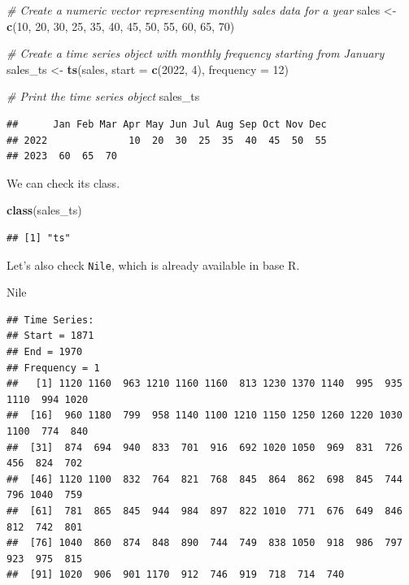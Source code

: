 \documentclass[
]{book}
\newenvironment{Shaded}{\begin{snugshade}}{\end{snugshade}}
\newcommand{\AttributeTok}[1]{\textcolor[rgb]{0.13,0.29,0.53}{#1}}
\newcommand{\CommentTok}[1]{\textcolor[rgb]{0.56,0.35,0.01}{\textit{#1}}}
\newcommand{\DecValTok}[1]{\textcolor[rgb]{0.00,0.00,0.81}{#1}}
\newcommand{\FunctionTok}[1]{\textcolor[rgb]{0.13,0.29,0.53}{\textbf{#1}}}
\newcommand{\NormalTok}[1]{#1}
\newcommand{\OtherTok}[1]{\textcolor[rgb]{0.56,0.35,0.01}{#1}}
\begin{document}
\begin{Shaded}
\begin{Highlighting}[]
\CommentTok{\# Create a numeric vector representing monthly sales data for a year}
\NormalTok{sales }\OtherTok{\textless{}{-}} \FunctionTok{c}\NormalTok{(}\DecValTok{10}\NormalTok{, }\DecValTok{20}\NormalTok{, }\DecValTok{30}\NormalTok{, }\DecValTok{25}\NormalTok{, }\DecValTok{35}\NormalTok{, }\DecValTok{40}\NormalTok{, }\DecValTok{45}\NormalTok{, }\DecValTok{50}\NormalTok{, }\DecValTok{55}\NormalTok{, }\DecValTok{60}\NormalTok{, }\DecValTok{65}\NormalTok{, }\DecValTok{70}\NormalTok{)}

\CommentTok{\# Create a time series object with monthly frequency starting from January}
\NormalTok{sales\_ts }\OtherTok{\textless{}{-}} \FunctionTok{ts}\NormalTok{(sales, }\AttributeTok{start =} \FunctionTok{c}\NormalTok{(}\DecValTok{2022}\NormalTok{, }\DecValTok{4}\NormalTok{), }\AttributeTok{frequency =} \DecValTok{12}\NormalTok{)}

\CommentTok{\# Print the time series object}
\NormalTok{sales\_ts}
\end{Highlighting}
\end{Shaded}

\begin{verbatim}
##      Jan Feb Mar Apr May Jun Jul Aug Sep Oct Nov Dec
## 2022              10  20  30  25  35  40  45  50  55
## 2023  60  65  70
\end{verbatim}

We can check its class.

\begin{Shaded}
\begin{Highlighting}[]
\FunctionTok{class}\NormalTok{(sales\_ts)}
\end{Highlighting}
\end{Shaded}

\begin{verbatim}
## [1] "ts"
\end{verbatim}

Let's also check \texttt{Nile}, which is already available in base R.

\begin{Shaded}
\begin{Highlighting}[]
\NormalTok{Nile}
\end{Highlighting}
\end{Shaded}

\begin{verbatim}
## Time Series:
## Start = 1871 
## End = 1970 
## Frequency = 1 
##   [1] 1120 1160  963 1210 1160 1160  813 1230 1370 1140  995  935 1110  994 1020
##  [16]  960 1180  799  958 1140 1100 1210 1150 1250 1260 1220 1030 1100  774  840
##  [31]  874  694  940  833  701  916  692 1020 1050  969  831  726  456  824  702
##  [46] 1120 1100  832  764  821  768  845  864  862  698  845  744  796 1040  759
##  [61]  781  865  845  944  984  897  822 1010  771  676  649  846  812  742  801
##  [76] 1040  860  874  848  890  744  749  838 1050  918  986  797  923  975  815
##  [91] 1020  906  901 1170  912  746  919  718  714  740
\end{verbatim}
\end{document}
